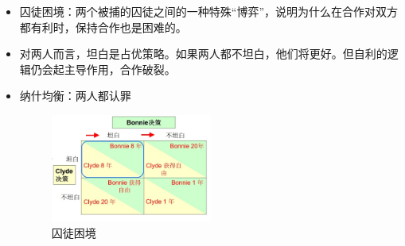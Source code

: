 \documentclass[12pt, a4paper]{article}
\begin{document}
\begin{itemize}
  \item 囚徒困境：两个被捕的囚徒之间的一种特殊“博弈”，说明为什么在合作对双方都有利时，保持合作也是困难的。
  \item 对两人而言，坦白是占优策略。如果两人都不坦白，他们将更好。但自利的逻辑仍会起主导作用，合作破裂。
  \item 纳什均衡：两人都认罪
  
  \begin{figure}[H] 
    \centering %
    \includegraphics[width=0.5\textwidth]{囚徒困境.png} 
    \caption{囚徒困境} %
  \end{figure}


\end{itemize}
\end{document}
